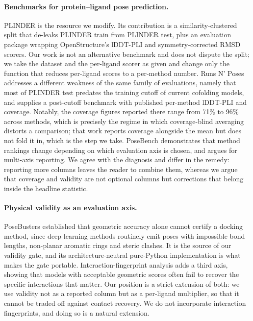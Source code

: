 \documentclass{article} %
\begin{document}
\paragraph{Benchmarks for protein--ligand pose prediction.} PLINDER
\citep{durairaj-2024-plinder} is the resource we modify. Its contribution is a
similarity-clustered split that de-leaks PLINDER train from PLINDER test, plus an
evaluation package wrapping OpenStructure's lDDT-PLI and symmetry-corrected RMSD
scorers. Our work is not an alternative benchmark and does not dispute the split; we
take the dataset and the per-ligand scorer as given and change only the function that
reduces per-ligand scores to a per-method number. Runs N' Poses
\citep{skrinjar-2025-have} addresses a different weakness of the same family of evaluations,
namely that most of PLINDER test predates the training cutoff of current cofolding
models, and supplies a post-cutoff benchmark with published per-method lDDT-PLI and
coverage. Notably, the coverage figures reported there range from 71\% to 96\% across
methods, which is precisely the regime in which coverage-blind averaging distorts a
comparison; that work reports coverage alongside the mean but does not fold it in, which
is the step we take. PoseBench \citep{morehead-2025-assessing} demonstrates that method
rankings change depending on which evaluation axis is chosen, and argues for multi-axis
reporting. We agree with the diagnosis and differ in the remedy: reporting more columns
leaves the reader to combine them, whereas we argue that coverage and validity are not
optional columns but corrections that belong inside the headline statistic.

\paragraph{Physical validity as an evaluation axis.} PoseBusters
\citep{buttenschoen-2023-posebusters} established that geometric accuracy alone cannot
certify a docking method, since deep learning methods routinely emit poses with
impossible bond lengths, non-planar aromatic rings and steric clashes. It is the source
of our validity gate, and its architecture-neutral pure-Python implementation is what
makes the gate portable. Interaction-fingerprint analysis
\citep{errington-2025-assessing} adds a third axis, showing that models with acceptable
geometric scores often fail to recover the specific interactions that matter. Our
position is a strict extension of both: we use validity not as a reported column but as
a per-ligand multiplier, so that it cannot be traded off against contact recovery. We do
not incorporate interaction fingerprints, and doing so is a natural extension.
\end{document}
